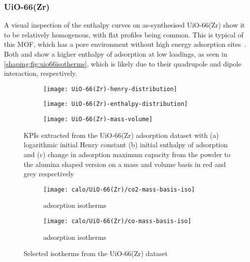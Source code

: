 
\subsubsection{UiO-66(Zr)}

A visual inspection of the enthalpy curves on as-synthesised UiO-66(Zr)
show it to be relatively homogenous, with flat
profiles being common. This is typical of this \gls{MOF}, which has
a pore environment without high energy adsorption 
sites~\cite{wiersumEvaluationUiO66GasBased2011}.
Both  and  show a higher enthalpy of adsorption
at low loadings, as seen in \autoref{shaping:fig:uio66isotherms},
which is likely due to their quadrupole and dipole interaction,
respectively.

\begin{figure}[p!]
	\centering
	\begin{subfigure}{\linewidth}
		\parbox[c]{0.1\linewidth}{\caption{}%
			\label{shaping:fig:analysisuio66henry}}%
		\parbox[b]{0.8\linewidth}{%
			\texttt{[image: UiO-66(Zr)-henry-distribution]}%
		}%
	\end{subfigure}%

	\begin{subfigure}{\linewidth}
		\parbox[c]{0.1\linewidth}{\caption{}%
			\label{shaping:fig:analysisuio66enth}}%
		\parbox[b]{0.8\linewidth}{%
			\texttt{[image: UiO-66(Zr)-enthalpy-distribution]}%
		}%
	\end{subfigure}%

	\begin{subfigure}{\linewidth}
		\parbox[c]{0.1\linewidth}{\caption{}%
			\label{shaping:fig:analysisuio66basis}}%
		\parbox[b]{0.8\linewidth}{%
			\texttt{[image: UiO-66(Zr)-mass-volume]}%
		}%
	\end{subfigure}%

	\caption{\glspl{KPI} extracted from the UiO-66(Zr) adsorption dataset with
		(a) logarithmic initial Henry constant (b) initial enthalpy of
        adsorption and (c) change in adsorption maximum capacity from 
        the powder to the alumina shaped version on a mass and volume 
        basis in red and grey respectively}%
	\label{shaping:fig:analysisuio66}
\end{figure}

\begin{figure}[htb]
	\centering
	\begin{subfigure}{0.45\textwidth}
		\texttt{[image: calo/UiO-66(Zr)/co2-mass-basis-iso]}
		\caption{ adsorption isotherms}%
		\label{shaping:fig:uio66co2ads}
	\end{subfigure}%
	\begin{subfigure}{0.45\textwidth}
		\texttt{[image: calo/UiO-66(Zr)/co-mass-basis-iso]}
		\caption{ adsorption isotherms}%
		\label{shaping:fig:uio66coads}
	\end{subfigure}%
	\caption{Selected isotherms from the UiO-66(Zr) dataset}%
	\label{shaping:fig:uio66isotherms}
\end{figure}

